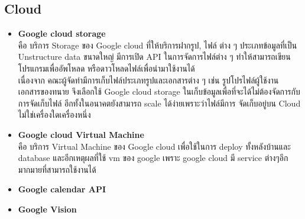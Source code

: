 \documentclass[12pt,oneside,openright,a4paper]{cpe-thai-project}
\begin{document}
\subsection{Cloud}
\begin{itemize}
\item \textbf{Google cloud storage} \\
\hspace*{1cm} คือ บริการ Storage ของ Google cloud ที่ให้บริการฝากรูป, ไฟล์ ต่าง ๆ ประเภทข้อมูลที่เป็น Unstructure data ขนาดใหญ่ มีการเปิด API ในการจัดการไฟล์ต่าง ๆ ทำให้สามารถเขียนโปรแกรมเพื่ออัพโหลด หรือดาวโหลดไฟล์เพื่อนำมาใช้งานได้ \\
\hspace*{1cm} เนื่องจาก คณะผู้จัดทำมีการเก็บไฟล์ประเภทรูปและเอกสารต่าง ๆ เช่น รูปโปรไฟล์ผู้ใช้งาน เอกสารของทนาย จึงเลือกใช้ Google cloud storage ในเก็บข้อมูลเพื่อที่จะได้ไม่ต้องจัดการกับการจัดเก็บไฟล์ อีกทั้งในอนาคตยังสามารถ scale ได้ง่ายเพราะว่าไฟล์มีการ จัดเก็บอยู่บน Cloud ไม่ใช่เครื่องใดเครื่องหนึ่ง
\item \textbf{Google cloud Virtual Machine} \\
\hspace*{1cm}	คือ บริการ Virtual Machine ของ Google cloud เพื่อใช้ในการ deploy ทั้งหลังบ้านและ database และอีกเหตุผลที่ใช้ vm ของ google เพราะ google cloud มี service ต่างๆอีกมากมายที่สามารถใช้งานได้ 
\item \textbf{Google calendar API} \\
\item \textbf{Google Vision}
\end{itemize}
\end{document}
